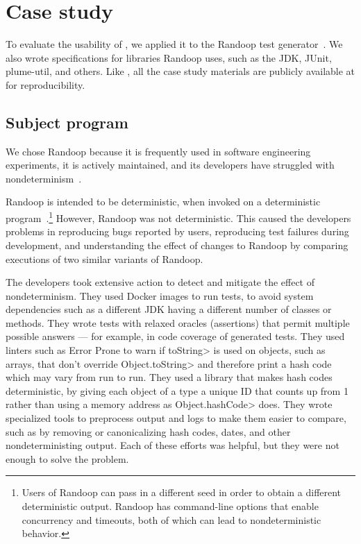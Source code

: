 \section{Case study}\label{sec:randoop-case-study}

To evaluate the usability of \theDeterminismChecker,
we applied it to the Randoop test
generator~\ifanonymous{}\else\cite{PachecoLEB2007}\fi.
We also wrote specifications for libraries Randoop uses, such as the JDK,
JUnit, plume-util, and others.
Like \theDeterminismCheckerImplementation,
all the case study materials are publicly available at  for reproducibility.


\subsection{Subject program}\label{sec:subject-program}

We chose Randoop because 
it is frequently used in software engineering experiments,
it is actively maintained,
and its developers have struggled with nondeterminism~\cite{randoop-issue-tracker,randoop-mailing-lists}.

Randoop is intended to be deterministic, when invoked on a deterministic
program~\cite{randoop-manual}.\footnote{Users of Randoop can pass in a different seed in order to
  obtain a different deterministic output.  Randoop has command-line
  options that enable concurrency and timeouts, both of which can lead to
  nondeterministic behavior.}
However, Randoop was not deterministic.  This caused the developers
problems in 
reproducing bugs reported by users, 
reproducing test failures during development, and
understanding the effect of changes to Randoop by comparing executions of two
similar variants of Randoop.

The developers took extensive action to detect and mitigate the effect of nondeterminism.
They used Docker images to run tests, to avoid system dependencies such as
a different JDK having a different number of classes or methods.
They wrote tests with relaxed oracles (assertions) that permit multiple
possible answers --- for example, in code coverage of generated tests.
They used linters such as Error Prone to warn if \<toString> is used on
objects, such as arrays, that don't override \<Object.toString> and therefore print a
hash code which may vary from run to run.
They used a library that makes hash codes deterministic, by giving each
object of a type a unique ID that counts up from 1 rather than using a
memory address as \<Object.hashCode> does.
They wrote specialized tools to preprocess output and logs to make them easier
to compare, such as by removing or canonicalizing hash codes, dates, and
other nondeterministing output.
Each of these efforts was helpful, but they were not enough to solve the problem.

